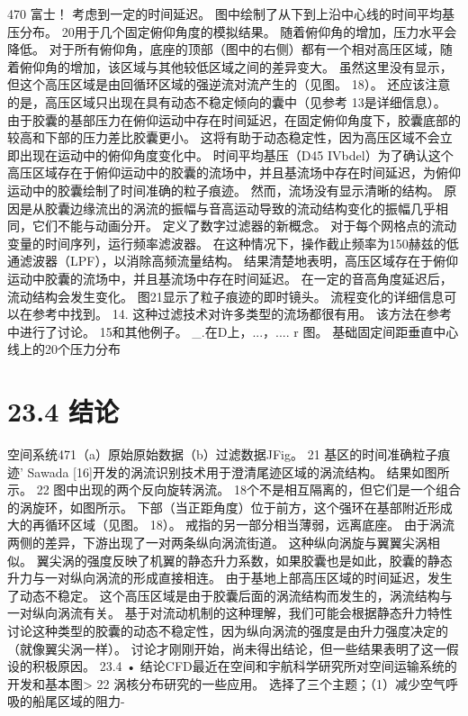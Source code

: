 \documentclass[UTF8,11pt,a4paper,openany,fontset=fandol]{ctexbook}
\begin{document}
470 富士！ 考虑到一定的时间延迟。 图中绘制了从下到上沿中心线的时间平均基压分布。 20用于几个固定俯仰角度的模拟结果。 随着俯仰角的增加，压力水平会降低。 对于所有俯仰角，底座的顶部（图中的右侧）都有一个相对高压区域，随着俯仰角的增加，该区域与其他较低区域之间的差异变大。 虽然这里没有显示，但这个高压区域是由回循环区域的强逆流对流产生的（见图。 18）。 还应该注意的是，高压区域只出现在具有动态不稳定倾向的囊中（见参考 13是详细信息）。 由于胶囊的基部压力在俯仰运动中存在时间延迟，在固定俯仰角度下，胶囊底部的较高和下部的压力差比胶囊更小。 这将有助于动态稳定性，因为高压区域不会立即出现在运动中的俯仰角度变化中。 时间平均基压（D45 IVbdel）为了确认这个高压区域存在于俯仰运动中的胶囊的流场中，并且基流场中存在时间延迟，为俯仰运动中的胶囊绘制了时间准确的粒子痕迹。 然而，流场没有显示清晰的结构。 原因是从胶囊边缘流出的涡流的振幅与音高运动导致的流动结构变化的振幅几乎相同，它们不能与动画分开。 定义了数字过滤器的新概念。 对于每个网格点的流动变量的时间序列，运行频率滤波器。 在这种情况下，操作截止频率为150赫兹的低通滤波器（LPF），以消除高频流量结构。 结果清楚地表明，高压区域存在于俯仰运动中胶囊的流场中，并且基流场中存在时间延迟。 在一定的音高角度延迟后，流动结构会发生变化。 图21显示了粒子痕迹的即时镜头。 流程变化的详细信息可以在参考中找到。 14. 这种过滤技术对许多类型的流场都很有用。 该方法在参考中进行了讨论。 15和其他例子。 \_.在D上，...，.... r 图。 基础固定间距垂直中心线上的20个压力分布

\section{23.4 结论}
空间系统471（a）原始原始数据（b）过滤数据JFig。 21 基区的时间准确粒子痕迹' Sawada [16]开发的涡流识别技术用于澄清尾迹区域的涡流结构。 结果如图所示。 22 图中出现的两个反向旋转涡流。 18个不是相互隔离的，但它们是一个组合的涡旋环，如图所示。 下部（当正距角度）位于前方，这个强环在基部附近形成大的再循环区域（见图。 18）。 戒指的另一部分相当薄弱，远离底座。 由于涡流两侧的差异，下游出现了一对两条纵向涡流街道。 这种纵向涡旋与翼翼尖涡相似。 翼尖涡的强度反映了机翼的静态升力系数，如果胶囊也是如此，胶囊的静态升力与一对纵向涡流的形成直接相连。 由于基地上部高压区域的时间延迟，发生了动态不稳定。 这个高压区域是由于胶囊后面的涡流结构而发生的，涡流结构与一对纵向涡流有关。 基于对流动机制的这种理解，我们可能会根据静态升力特性讨论这种类型的胶囊的动态不稳定性，因为纵向涡流的强度是由升力强度决定的（就像翼尖涡一样）。 讨论才刚刚开始，尚未得出结论，但一些结果表明了这一假设的积极原因。 23.4 • 结论CFD最近在空间和宇航科学研究所对空间运输系统的开发和基本图> 22 涡核分布研究的一些应用。 选择了三个主题；（1）减少空气呼吸的船尾区域的阻力-
\end{document}
